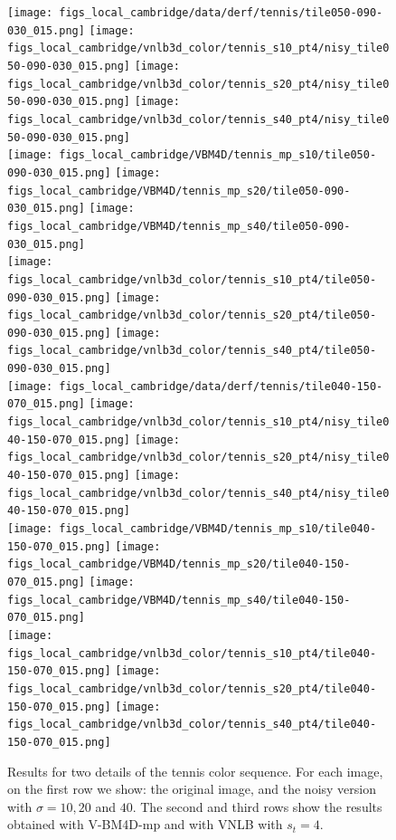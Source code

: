 \documentclass[10pt, a4paper]{article}
\begin{document}
\begin{figure}[htpb!]
	\centering
	\texttt{[image: figs\_local\_cambridge/data/derf/tennis/tile050-090-030\_015.png]}%
	\texttt{[image: figs\_local\_cambridge/vnlb3d\_color/tennis\_s10\_pt4/nisy\_tile050-090-030\_015.png]}%
	\texttt{[image: figs\_local\_cambridge/vnlb3d\_color/tennis\_s20\_pt4/nisy\_tile050-090-030\_015.png]}%
	\texttt{[image: figs\_local\_cambridge/vnlb3d\_color/tennis\_s40\_pt4/nisy\_tile050-090-030\_015.png]}\\
	\hspace               {0.2\textwidth}%
	\texttt{[image: figs\_local\_cambridge/VBM4D/tennis\_mp\_s10/tile050-090-030\_015.png]}%
	\texttt{[image: figs\_local\_cambridge/VBM4D/tennis\_mp\_s20/tile050-090-030\_015.png]}%
	\texttt{[image: figs\_local\_cambridge/VBM4D/tennis\_mp\_s40/tile050-090-030\_015.png]}\\
	\hspace               {0.2\textwidth}%
	\texttt{[image: figs\_local\_cambridge/vnlb3d\_color/tennis\_s10\_pt4/tile050-090-030\_015.png]}%
	\texttt{[image: figs\_local\_cambridge/vnlb3d\_color/tennis\_s20\_pt4/tile050-090-030\_015.png]}%
	\texttt{[image: figs\_local\_cambridge/vnlb3d\_color/tennis\_s40\_pt4/tile050-090-030\_015.png]}\\

	\vspace{.1cm}
	\texttt{[image: figs\_local\_cambridge/data/derf/tennis/tile040-150-070\_015.png]}%
	\texttt{[image: figs\_local\_cambridge/vnlb3d\_color/tennis\_s10\_pt4/nisy\_tile040-150-070\_015.png]}%
	\texttt{[image: figs\_local\_cambridge/vnlb3d\_color/tennis\_s20\_pt4/nisy\_tile040-150-070\_015.png]}%
	\texttt{[image: figs\_local\_cambridge/vnlb3d\_color/tennis\_s40\_pt4/nisy\_tile040-150-070\_015.png]}\\
	\hspace               {0.2\textwidth}%
	\texttt{[image: figs\_local\_cambridge/VBM4D/tennis\_mp\_s10/tile040-150-070\_015.png]}%
	\texttt{[image: figs\_local\_cambridge/VBM4D/tennis\_mp\_s20/tile040-150-070\_015.png]}%
	\texttt{[image: figs\_local\_cambridge/VBM4D/tennis\_mp\_s40/tile040-150-070\_015.png]}\\
	\hspace               {0.2\textwidth}%
	\texttt{[image: figs\_local\_cambridge/vnlb3d\_color/tennis\_s10\_pt4/tile040-150-070\_015.png]}%
	\texttt{[image: figs\_local\_cambridge/vnlb3d\_color/tennis\_s20\_pt4/tile040-150-070\_015.png]}%
	\texttt{[image: figs\_local\_cambridge/vnlb3d\_color/tennis\_s40\_pt4/tile040-150-070\_015.png]}\\
	\caption{Results for two details of the tennis color sequence. For each
	image, on the first row we show: the original image, and the noisy version
	with $\sigma = 10,20$ and $40$. The second and third rows show the results
	obtained with V-BM4D-mp and with VNLB with $s_t = 4$.}
	\label{fig:results-tennis}
\end{figure}
\end{document}
